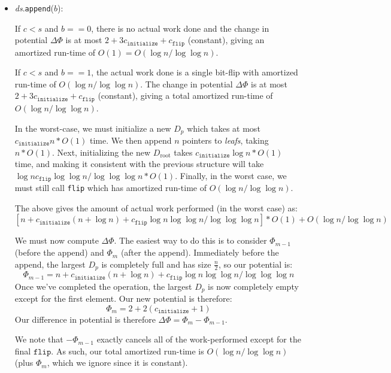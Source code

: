\documentclass[12pt]{exam}
\newcommand*{\bigo}[1]{O \left( #1 \right)}
\begin{document}
\begin{questions}
\begin{solution}
\begin{itemize}
  \item \textit{ds}.\texttt{append}($b$):

    If $c < s$ and $b == 0$, there is no actual work done and the change in potential $\Delta \Phi$ is at most $2 + 3c_{\texttt{initialize}} + c_{\texttt{flip}}$ (constant), giving an amortized run-time of $\bigo{1} = \bigo{\log n / \log \log n}$.

    If $c < s$ and $b == 1$, the actual work done is a single bit-flip with amortized run-time of $\bigo{\log n / \log \log n}$. The change in potential $\Delta \Phi$ is at most $2 + 3c_{\texttt{initialize}} + c_{\texttt{flip}}$ (constant), giving a total amortized run-time of $\bigo{\log n / \log \log n}$.

    In the worst-case, we must initialize a new $D_p$ which takes at most $c_{\texttt{initialize}} n * \bigo{1}$ time. We then append $n$ pointers to \textit{leafs}, taking $n * \bigo{1}$. Next, initializing the new $D_{\text{root}}$ takes $c_{\texttt{initialize}} \log n * \bigo{1}$ time, and making it consistent with the previous structure will take $ \log n c_{\texttt{flip}} \log \log n / \log \log \log n * \bigo{1}$. Finally, in the worst case, we must still call \texttt{flip} which has amortized run-time of $\bigo{\log n / \log \log n}$. 

    The above gives the amount of actual work performed (in the worst case) as:
    $$
      [n + c_{\texttt{initialize}}(n + \log n) + c_{\texttt{flip}}\log n \log \log n / \log \log \log n] * \bigo{1} + \bigo{\log n / \log \log n}
    $$

    We must now compute $\Delta \Phi$. The easiest way to do this is to consider $\Phi_{m-1}$ (before the append) and $\Phi_{m}$ (after the append). Immediately before the append, the largest $D_p$ is completely full and has size $\frac{n}{2}$, so our potential is: 
    $$
      \Phi_{m-1} = n + c_{\texttt{initialize}}(n + \log n) + c_{\texttt{flip}} \log n \log \log n / \log \log \log n
    $$
    Once we've completed the operation, the largest $D_p$ is now completely empty except for the first element. Our new potential is therefore:
    $$
      \Phi_{m} = 2 + 2(c_{\texttt{initialize}} + 1)
    $$
    Our difference in potential is therefore $\Delta \Phi = \Phi_{m} - \Phi_{m-1}$.

    We note that $-\Phi_{m-1}$ exactly cancels all of the work-performed except for the final $\texttt{flip}$. As such, our total amortized run-time is $\bigo{\log n / \log \log n}$ (plus $\Phi_m$, which we ignore since it is constant).
\end{itemize}


\end{solution}
\end{questions}
\end{document}
